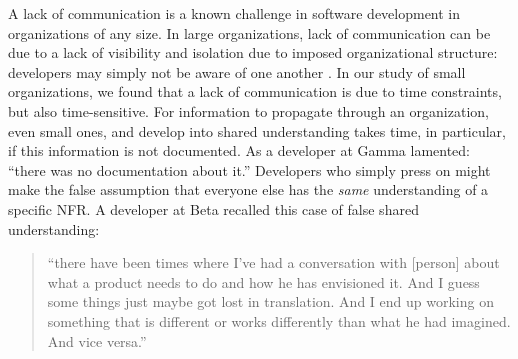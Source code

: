 \documentclass[smallextended]{svjour3}        %
\begin{document}
A lack of communication is a known challenge in software development in organizations of any size. 
In large organizations, lack of communication can be due to a lack of visibility and isolation due to imposed organizational structure: developers may simply not be aware of one another \citep{stol2014key}. In our study of small organizations, we found that a lack of communication is due to time constraints, but also time-sensitive. 
For information to propagate through an organization, even small ones, and develop into shared understanding takes time, in particular, if this information is not documented. As a developer at Gamma lamented:
\textmd{``there was no documentation about it.''}
Developers who simply press on might make the false assumption that everyone else has the \emph{same} understanding of a specific NFR. A developer at Beta recalled this case of false shared understanding:
\begin{quote}
    ``there have been times where I've had a conversation with [person] about what a product needs to do and how he has envisioned it. And I guess some things just maybe got lost in translation. And I end up working on something that is different or works differently than what he had imagined. And vice versa.''
\end{quote}    
\end{document}
